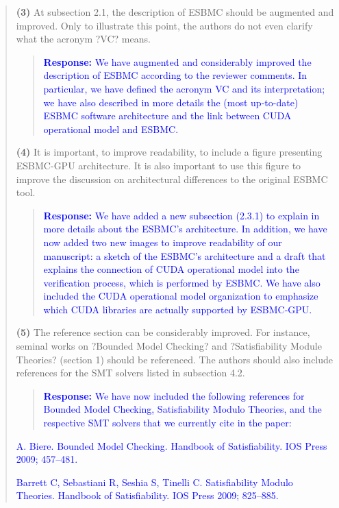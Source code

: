 \documentclass[11pt]{article}
\begin{document}
\begin{quote}
{\bf(3)} At subsection 2.1, the description of ESBMC should be augmented and improved. Only to illustrate this point, the authors do not even clarify what the acronym ?VC? means.

\begin{quote}
\textcolor{blue}{\textbf{Response:} We have augmented and considerably improved the description of ESBMC according to the reviewer comments. In particular, we have defined the acronym VC and its interpretation; we have also described in more details the (most up-to-date) ESBMC software architecture and the link between CUDA operational model and ESBMC.}
\end{quote}

{\bf(4)} It is important, to improve readability, to include a figure presenting ESBMC-GPU architecture. It is also important to use this figure to improve the discussion on architectural differences to the original ESBMC tool.

\begin{quote}
\textcolor{blue}{\textbf{Response:} We have added a new subsection (2.3.1) to explain in more details about the ESBMC's architecture. In addition, we have now added two new images to improve readability of our manuscript: a sketch of the ESBMC's architecture and a draft that explains the connection of CUDA operational model into the verification process, which is performed by ESBMC. We have also included the CUDA operational model organization to emphasize which CUDA libraries are actually supported by ESBMC-GPU.}
\end{quote}

{\bf(5)} The reference section can be considerably improved. For instance, seminal works on ?Bounded Model Checking? and ?Satisfiability Module Theories? (section 1) should be referenced. The authors should also include references for the SMT solvers listed in subsection 4.2.

\begin{quote}
\textcolor{blue}{\textbf{Response:} We have now included the following references for Bounded Model Checking, Satisfiability Modulo Theories, and the respective SMT solvers that we currently cite in the paper:} 
\end{quote}
\textcolor{blue}{A. Biere. Bounded Model Checking. Handbook of Satisfiability. IOS Press 2009; 457--481.}

\textcolor{blue}{Barrett C, Sebastiani R, Seshia S, Tinelli C. Satisfiability Modulo Theories. Handbook of Satisfiability. IOS Press 2009; 825--885.}


\end{quote}
\end{document}
